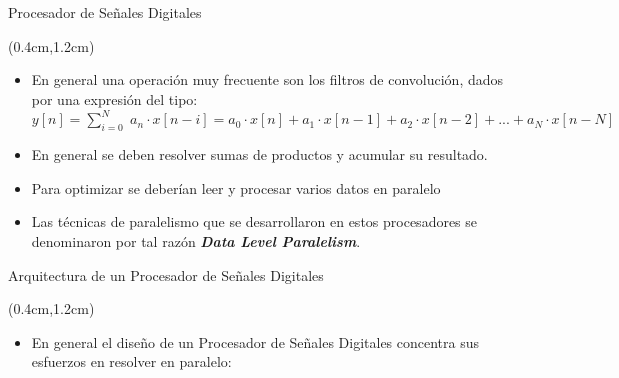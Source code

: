 \begin{frame}{Procesador de Señales Digitales}
 \begin{textblock*}{\textwidth}(0.4cm,1.2cm)
  \begin{itemize}[<+(1)->]\justifying
   \item En general una operación muy frecuente son los filtros de convolución, dados por una expresión del tipo:\\
$\displaystyle y[n] = \sum_{i=0}^{N} \; a_{n}\cdot x[n-i] = a_{0}\cdot x[n] + a_{1}\cdot x[n-1] + a_{2}\cdot x[n-2] + ...  + a_{N}\cdot x[n-N]$
   \item En general se deben resolver sumas de productos y acumular su resultado.
   \item Para optimizar se deberían leer y procesar varios datos en paralelo
   \item Las técnicas de paralelismo que se desarrollaron en estos procesadores se denominaron por tal razón \textbf{\textit{\color{blue}Data Level Paralelism}}.
  \end{itemize}
 \end{textblock*}
\end{frame}

\begin{frame}{Arquitectura de un Procesador de Señales Digitales}
 \begin{textblock*}{\textwidth}(0.4cm,1.2cm)
  \begin{itemize}[<+(1)->]\justifying
   \item En general el diseño de un Procesador de Señales Digitales concentra sus esfuerzos en resolver en paralelo:
  \end{itemize}
 \end{textblock*}
\end{frame}
